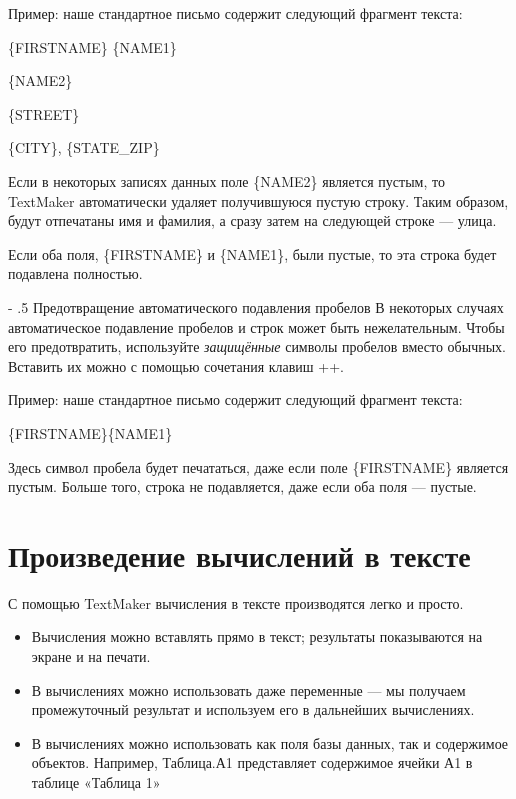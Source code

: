 ﻿\documentclass[a4paper,10pt]{article}
\makeatletter
\renewcommand\paragraph{%
   \@startsection{paragraph}{4}{0mm}%
      {-\baselineskip}%
      {.5\baselineskip}%
      {\normalfont\normalsize\bfseries}}
\makeatother
\begin{document}
Пример: наше стандартное письмо содержит следующий фрагмент текста:

\{FIRSTNAME\} \{NAME1\}

\{NAME2\}

\{STREET\}

\{CITY\}, \{STATE\_ZIP\}


Если в некоторых записях данных поле \{NAME2\} является пустым, то TextMaker автоматически удаляет получившуюся пустую строку. Таким образом, будут отпечатаны имя и фамилия, а сразу затем на следующей строке — улица.

Если оба поля, \{FIRSTNAME\} и \{NAME1\}, были пустые, то эта строка будет подавлена полностью.

\paragraph{Предотвращение автоматического подавления пробелов}
В некоторых случаях автоматическое подавление пробелов и строк может быть нежелательным. Чтобы его предотвратить, используйте \textit{защищённые} символы пробелов вместо обычных. Вставить их можно с помощью сочетания клавиш ++.

Пример: наше стандартное письмо содержит следующий фрагмент текста:

\{FIRSTNAME\}<защищённый символ пробела>\{NAME1\}

Здесь символ пробела будет печататься, даже если поле \{FIRSTNAME\} является пустым. Больше того, строка не подавляется, даже если оба поля — пустые.

\section{Произведение вычислений в тексте} \label{sec:произввычислвтексте}
С помощью TextMaker вычисления в тексте производятся легко и просто.

\begin{itemize}
 \item Вычисления можно вставлять прямо в текст; результаты показываются на экране и на печати.
 \item В вычислениях можно использовать даже переменные — мы получаем промежуточный результат и используем его в дальнейших вычислениях.
 \item В вычислениях можно использовать как поля базы данных, так и содержимое объектов. Например, Таблица.А1 представляет содержимое ячейки А1 в таблице «Таблица 1»
\end{itemize}
\end{document}
